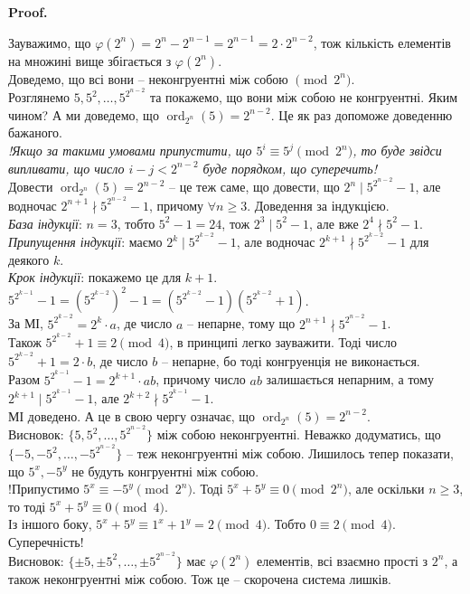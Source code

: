 \documentclass[a4paper, 14pt]{extarticle}
\makeatletter
\theoremstyle{theoremdd}
\theoremstyle{theoremdd}
\theoremstyle{theoremdd}
\theoremstyle{theoremdd}
\theoremstyle{theoremdd}
\theoremstyle{theoremdd}
\theoremstyle{theoremdd}
\theoremstyle{theoremdd}
\def\qed{$\blacksquare$}
\renewenvironment{proof}[1][Proof.\\]{\par
\pushQED{\hfill \qed}%
\normalfont \topsep6\p@\@plus6\p@\relax
\trivlist
\item\relax
{\bfseries
#1\@addpunct{.}}\hspace\labelsep\ignorespaces
}{%
\popQED\endtrivlist\@endpefalse
}
\DeclareMathOperator{\ord}{ord}
\makeatother
\begin{document}
\begin{proof}
Зауважимо, що $\varphi(2^n) = 2^n - 2^{n-1} = 2^{n-1} = 2 \cdot 2^{n-2}$, тож кількість елементів на множині вище збігається з $\varphi(2^n)$.\\
Доведемо, що всі вони -- неконгруентні між собою $\pmod {2^n}$.\\
Розглянемо $5,5^2,\dots,5^{2^{n-2}}$ та покажемо, що вони між собою не конгруентні. Яким чином? А ми доведемо, що $\ord_{2^n} (5) = 2^{n-2}$. Це як раз допоможе доведенню бажаного.\\
\textit{!Якщо за такими умовами припустити, що $5^i \equiv 5^j \pmod {2^n}$, то буде звідси випливати, що число $i-j < 2^{n-2}$ буде порядком, що суперечить!}\\
\iffalse
Маємо $\ord_{2^n}(5) \mid \underset{=\varphi(2^{n})}{2^{n-1}}$. Але оскільки для $\pmod {2^n}$ не існує первісного кореня, то $\ord_{2^n}(5) < 2^{n-1}$. Тому можна гарантувати, що виконується $\ord_{2^n}(5) \mid \dfrac{2^{n-1}}{2} = 2^{n-2}$.\\
\fi
Довести $\ord_{2^n} (5) = 2^{n-2}$ -- це теж саме, що довести, що $2^n \mid 5^{2^{n-2}}-1$, але водночас $2^{n+1} \nmid 5^{2^{n-2}} - 1$, причому $\forall n \geq 3$. Доведення за індукцією.\\
\textit{База індукції}: $n=3$, тобто $5^2-1 = 24$, тож $2^3 \mid 5^2-1$, але вже $2^4 \nmid 5^2-1$.\\
\textit{Припущення індукції}: маємо $2^k \mid 5^{2^{k-2}}-1$, але водночас $2^{k+1} \nmid 5^{2^{k-2}} - 1$ для деякого $k$.\\
\textit{Крок індукції}: покажемо це для $k+1$.\\
$5^{2^{k-1}} - 1 = (5^{2^{k-2}})^2 - 1 = \left( 5^{2^{k-2}}-1 \right) \left( 5^{2^{k-2}}+1 \right)$.\\
За МІ, $5^{2^{k-2}} = 2^k \cdot a$, де число $a$ -- непарне, тому що $2^{n+1} \nmid 5^{2^{n-2}}-1$.\\
Також $5^{2^{k-2}}+1 \equiv 2 \pmod 4$, в принципі легко зауважити. Тоді число $5^{2^{k-2}}+1 =2 \cdot b$, де число $b$ -- непарне, бо тоді конгруенція не виконається.\\
Разом $5^{2^{k-1}} -1 = 2^{k+1} \cdot ab$, причому число $ab$ залишається непарним, а тому $2^{k+1} \mid 5^{2^{k-1}} -1$, але $2^{k+2} \nmid 5^{2^{k-1}} -1$.\\
МІ доведено. А це в свою чергу означає, що $\ord_{2^n}(5) = 2^{n-2}$.
\bigskip \\
Висновок: $\{5,5^2,\dots,5^{2^{n-2}}\}$ між собою неконгруентні. Неважко додуматись, що $\{-5,-5^2,\dots,-5^{2^{n-2}}\}$ -- теж неконгруентні між собою. Лишилось тепер показати, що $5^x, -5^y$ не будуть конгруентні між собою.\\
!Припустимо $5^x \equiv - 5^y \pmod {2^n}$. Тоді $5^x + 5^y \equiv 0 \pmod {2^n}$, але оскільки $n \geq 3$, то тоді $5^x + 5^y \equiv 0 \pmod 4$.\\
Із іншого боку, $5^x + 5^y \equiv 1^x + 1^y = 2 \pmod 4$. Тобто $0 \equiv 2 \pmod 4$. Суперечність!\\
Висновок: $\{\pm 5, \pm 5^2, \dots, \pm 5^{2^{n-2}}\}$ має $\varphi(2^n)$ елементів, всі взаємно прості з $2^n$, а також неконгруентні між собою. Тож це -- скорочена система лишків.
\end{proof}
\end{document}
